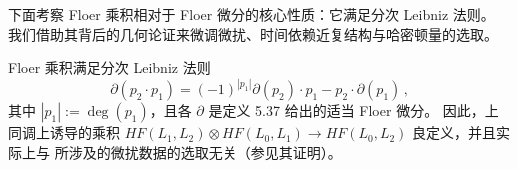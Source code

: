 
下面考察 Floer 乘积相对于 Floer 微分的核心性质：它满足分次 Leibniz 法则。
我们借助其背后的几何论证来微调微扰、时间依赖近复结构与哈密顿量的选取。

\begin{Pro}\label{pro:6.4}
Floer 乘积满足分次 Leibniz 法则
\begin{equation}
\partial(p_2\cdot p_1)=(-1)^{|p_1|}\partial(p_2)\cdot p_1
-p_2\cdot\partial(p_1)\,,
\label{eq:6.80}
\end{equation}
其中 $|p_1|:=\deg(p_1)$，且各 $\partial$ 是定义 5.37 给出的适当 Floer 微分。
因此，上同调上诱导的乘积
$HF(L_1,L_2)\otimes HF(L_0,L_1)\to HF(L_0,L_2)$ 良定义，并且实际上与
所涉及的微扰数据的选取无关（参见其证明）。
\end{Pro}


